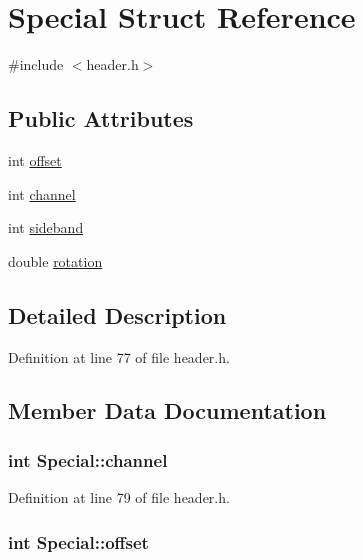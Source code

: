 \hypertarget{structSpecial}{
\section{Special Struct Reference}
\label{structSpecial}
}


{\ttfamily \#include $<$header.h$>$}\subsection*{Public Attributes}
\begin{DoxyCompactItemize}
\item 
int \hyperlink{structSpecial_a810bc5ddd5dea23779f46a9734c057c6}{offset}
\item 
int \hyperlink{structSpecial_aa3b54793eca81136066ba3cf233e79fe}{channel}
\item 
int \hyperlink{structSpecial_ae089f87340180c38a7bd54062505b909}{sideband}
\item 
double \hyperlink{structSpecial_a56799b3053803e5e2634306472390666}{rotation}
\end{DoxyCompactItemize}


\subsection{Detailed Description}


Definition at line 77 of file header.h.

\subsection{Member Data Documentation}
\hypertarget{structSpecial_aa3b54793eca81136066ba3cf233e79fe}{
\subsubsection[{channel}]{\setlength{\rightskip}{0pt plus 5cm}int {\bf Special::channel}}}
\label{structSpecial_aa3b54793eca81136066ba3cf233e79fe}


Definition at line 79 of file header.h.\hypertarget{structSpecial_a810bc5ddd5dea23779f46a9734c057c6}{
\subsubsection[{offset}]{\setlength{\rightskip}{0pt plus 5cm}int {\bf Special::offset}}}
\label{structSpecial_a810bc5ddd5dea23779f46a9734c057c6}


